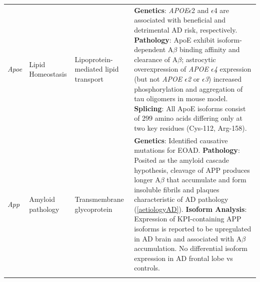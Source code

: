 \begin{landscape}
\begin{longtable}[c]{p{1cm}p{2cm}p{4cm}p{19cm}}
			\centering \textit{Apoe} &
			\centering Lipid Homeostasis  &
			\centering Lipoprotein-mediated lipid transport  &
			\tabitem \textbf{Genetics}: \textit{APOE}$\epsilon$2 and $\epsilon$4 are associated with beneficial and detrimental AD risk, respectively. \newline
			\tabitem \textbf{Pathology}: ApoE exhibit isoform-dependent A$\beta$ binding affinity and clearance of A$\beta$; astrocytic overexpression of \textit{APOE $\epsilon$4} expression (but not \textit{APOE $\epsilon$2} or \textit{$\epsilon$3}) increased phosphorylation and aggregation of tau oligomers in mouse model\cite{Jablonski2021}. \newline
			\tabitem \textbf{Splicing}: All ApoE isoforms consist of 299 amino acids differing only at two key residues (Cys-112, Arg-158). \\
			
			\centering \textit{App} &
			\centering Amyloid pathology  &
			\centering Transmembrane glycoprotein  &
			\tabitem \textbf{Genetics}: Identified causative mutations for EOAD. \newline
			\tabitem \textbf{Pathology}: Posited as the amyloid cascade hypothesis, cleavage of APP produces longer A$\beta$ that accumulate and form insoluble fibrils and plaques characteristic of AD pathology (\cref{aetiologyAD}).\newline
			\tabitem \textbf{Isoform Analysis}: Expression of KPI-containing APP isoforms is reported to be upregulated in AD brain and associated with A$\beta$ accumulation\cite{Zhang2011}. No differential isoform expression in AD frontal lobe vs controls\cite{Panegyres2000}. \\
			\hdashline[0.5pt/5pt]
			

\end{longtable}
\end{landscape}

